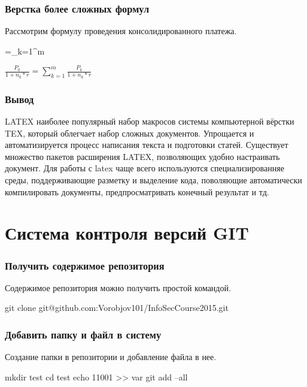\documentclass[a4paper,12pt]{article}
\begin{document}
\section[6]{Верстка более сложных формул}

Рассмотрим формулу проведения консолидированного платежа.
\begin{verbatim*}
	=\sum_{k=1}^{m}
\end{verbatim*}
\begin{math}
\frac{P_{0}}{1+n_{0}*r}=\sum_{k=1}^{m}\frac{P_{k}}{1+n_{k}*r}
\end{math}

\section[6]{Вывод}

LATEX наиболее популярный набор макросов системы компьютерной вёрстки TEX, который облегчает набор сложных документов. Упрощается и автоматизируется процесс написания текста и подготовки статей. Существует множество пакетов расширения LATEX, позволяющих удобно настраивать документ.
Для работы с latex чаще всего используются специализированняе среды, поддерживающие разметку и выделение кода, поволяющие автоматически компилировать документы, предпросматривать конечный результат и тд.

\part[2]{Система контроля версий GIT}

\section[1]{Получить содержимое репозитория}

Содержимое репозитория можно получить простой командой.
\begin{verbatim*}
git clone git@github.com:Vorobjov101/InfoSecCourse2015.git
\end{verbatim*}

\section[2]{Добавить папку и файл в систему}

Создание папки в репозитории и добавление файла в нее.
\begin{verbatim*}
mkdir test
cd test
echo 11001 >> var
git add --all
\end{verbatim*}
\end{document}
